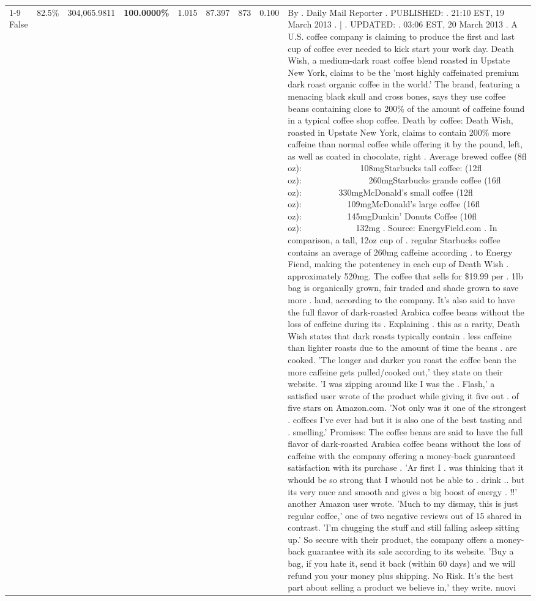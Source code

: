 \begin{table}[H]
{\begin{tabular}{lllrlllll}
\cline{1-9} \cline{2-9}
False & 82.5\% & 304,065.9811 & \bfseries \color{red} 100.0000\% & 1.015 & 87.397 & 873 & 0.100 & By . Daily Mail Reporter . PUBLISHED: . 21:10 EST, 19 March 2013 . | . UPDATED: . 03:06 EST, 20 March 2013 . A U.S. coffee company is claiming to produce the first and last cup of coffee ever needed to kick start your work day. Death Wish, a medium-dark roast coffee blend roasted in Upstate New York, claims to be the 'most highly caffeinated premium dark roast organic coffee in the world.' The brand, featuring a menacing black skull and cross bones, says they use coffee beans containing close to 200\% of the amount of caffeine found in a typical coffee shop coffee. Death by coffee: Death Wish, roasted in Upstate New York, claims to contain 200\% more caffeine than normal coffee while offering it by the pound, left, as well as coated in chocolate, right . Average brewed coffee (8fl oz):              108mgStarbucks tall coffee: (12fl oz):                260mgStarbucks grande coffee (16fl oz):         330mgMcDonald's small coffee (12fl oz):           109mgMcDonald's large coffee (16fl oz):           145mgDunkin' Donuts Coffee (10fl oz):             132mg . Source: EnergyField.com . In comparison, a tall, 12oz cup of . regular Starbucks coffee contains an average of 260mg caffeine according . to Energy Fiend, making the potentency in each cup of Death Wish . approximately 520mg. The coffee that sells for \$19.99 per . 1lb bag is organically grown, fair traded and shade grown to save more . land, according to the company. It's also said to have the full flavor of dark-roasted Arabica coffee beans without the loss of caffeine during its . Explaining . this as a rarity, Death Wish states that dark roasts typically contain . less caffeine than lighter roasts due to the amount of time the beans . are cooked. 'The longer and darker you roast the coffee bean the more caffeine gets pulled/cooked out,' they state on their website. 'I was zipping around like I was the . Flash,' a satisfied user wrote of the product while giving it five out . of five stars on Amazon.com. 'Not only was it one of the strongest . coffees I've ever had but it is also one of the best tasting and . smelling.’ Promises: The coffee beans are said to have the full flavor of dark-roasted Arabica coffee beans without the loss of caffeine with the company offering a money-back guaranteed satisfaction with its purchase . 'Ar first I . was thinking that it whould be so strong that I whould not be able to . drink .. but its very nuce and smooth and gives a big boost of energy . !!' another Amazon user wrote. 'Much to my dismay, this is just regular coffee,' one of two negative reviews out of 15 shared in contrast. 'I'm chugging the stuff and still falling asleep sitting up.' So secure with their product, the company offers a money-back guarantee with its sale according to its website. 'Buy a bag, if you hate it, send it back (within 60 days) and we will refund you your money plus shipping. No Risk. It’s the best part about selling a product we believe in,' they write. nuovi \\

\end{tabular}}
\end{table}
